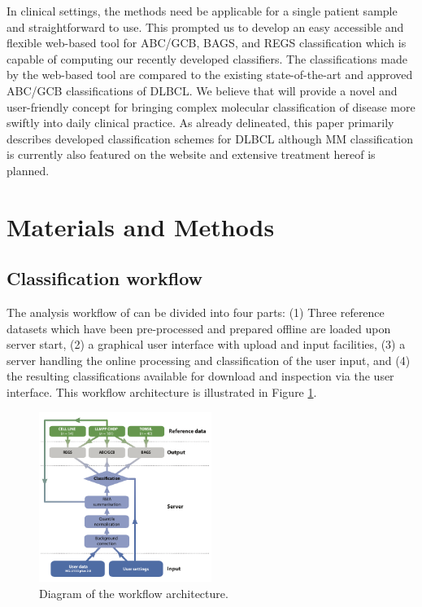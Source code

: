 \documentclass{article}
\begin{document}
In clinical settings, the methods need be applicable for a single patient sample and straightforward to use.
This prompted us to develop an easy accessible and flexible web-based tool for ABC/GCB, BAGS, and REGS classification which is capable of computing our recently developed classifiers.
The classifications made by the web-based tool \hemaClass{} are compared to the existing state-of-the-art and approved ABC/GCB classifications of DLBCL.
We believe that \hemaClass{} will provide a novel and user-friendly concept for bringing complex molecular classification of disease more swiftly into daily clinical practice.
As already delineated, this paper primarily describes developed classification schemes for DLBCL although MM classification is currently also featured on the website and extensive treatment hereof is planned.


\section{Materials and Methods}

\subsection{Classification workflow}
The analysis workflow of \hemaClass{} can be divided into four parts:
(1) Three reference datasets which have been pre-processed and prepared offline are loaded upon server start,
(2) a graphical user interface with upload and input facilities,
(3) a server handling the online processing and classification of the user input, and
(4) the resulting classifications available for download and inspection via the user interface.
This workflow architecture is illustrated in Figure \ref{fig:webtooldiagram}.

\begin{figure}
\begin{center}
\includegraphics[width=0.5\textwidth]{figures/Flowchart6.pdf}
\end{center}
\caption{Diagram of the workflow architecture.}
\label{fig:webtooldiagram}
\end{figure}
\end{document}
